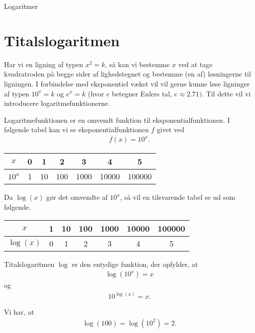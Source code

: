 
\begin{center}
\Huge
Logaritmer
\end{center}

\section*{Titalslogaritmen}
Har vi en ligning af typen $x^2 = k$, så kan vi bestemme $x$ ved at tage kvadratroden på begge sider af lighedstegnet og bestemme (en af) løsningerne til ligningen. I forbindelse med eksponentiel vækst
vil vil gerne kunne løse ligninger af typen $10^x = k$ og $e^x=k$  (hvor $e$ betegner Eulers tal, $e \approx 2.71)$. Til dette vil vi introducere logaritmefunktionerne. 

Logaritmefunktionen er en omvendt funktion til eksponentialfunktionen. I følgende tabel kan vi se eksponentialfunktionen $f$ givet ved
\begin{align*}
	f(x) = 10^x.
\end{align*}

\begin{table}[H]
	\centering
	\begin{tabular}{c|c|c|c|c|c|c}
		$x$ & 0 & 1 & 2 & 3 & 4 & 5\\
		\hline
		$10^x$ & 1 & 10 & 100 & 1000 & 10000 & 100000
	\end{tabular}
\end{table}
Da $\log(x)$ gør det omvendte af $10^x$, så vil en tilsvarende tabel se ud som følgende.
\begin{table}[H]
	\centering
	\begin{tabular}{c|c|c|c|c|c|c}
		$x$ & 1 & 10 & 100 & 1000 & 10000 & 100000 \\
		\hline
		$\log(x)$ & 0 & 1 & 2 & 3 & 4 & 5
	\end{tabular}
\end{table}
\begin{defn}[Titalslogaritmen]
	Titalslogaritmen $\log$ er den entydige funktion, der opfylder, at 
	\begin{align*}
		\log(10^x) = x
	\end{align*}
	og 
	\begin{align*}
		10^{\log(x)} = x.
	\end{align*}
\end{defn}

\begin{exa}
	Vi har, at 
	\begin{align*}
		\log(100) = \log(10^2) = 2.
	\end{align*}
\end{exa}

